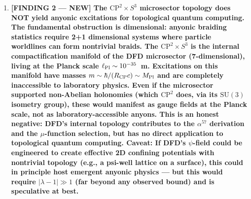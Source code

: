 \documentclass[11pt]{article}
\theoremstyle{definition}
\theoremstyle{remark}
\newcommand{\lamdiff}{|\lambda-1|}
\begin{document}
\begin{tcolorbox}[colback=blue!5!white, colframe=blue!60!black,
  title=\textbf{W4i16 TOP 5 FINDINGS --- READ FIRST}]
\begin{enumerate}[nosep]
\item \textbf{[FINDING 2 --- NEW] The $\mathrm{CP}^2 \times S^3$ microsector
  topology does NOT yield anyonic excitations for topological quantum computing.
  The fundamental obstruction is dimensional: anyonic braiding statistics require
  2+1 dimensional systems where particle worldlines can form nontrivial braids.
  The $\mathrm{CP}^2 \times S^3$ is the internal compactification manifold of
  the DFD microsector (7-dimensional), living at the Planck scale $\ell_{\rm Pl}
  \sim 10^{-35}$~m.  Excitations on this manifold have masses $m \sim
  \hbar/(R_{\rm CP} c) \sim M_{\rm Pl}$ and are completely inaccessible to
  laboratory physics.  Even if the microsector supported non-Abelian holonomies
  (which $\mathrm{CP}^2$ does, via its $\mathrm{SU}(3)$ isometry group), these
  would manifest as gauge fields at the Planck scale, not as laboratory-accessible
  anyons.  This is an honest negative:  DFD's internal topology contributes
  to the $\alpha^{57}$ derivation and the $\mu$-function selection, but has
  no direct application to topological quantum computing.
  \textbf{Caveat}: If DFD's $\psi$-field could be engineered to create effective
  2D confining potentials with nontrivial topology (e.g., a psi-well lattice
  on a surface), this could in principle host emergent anyonic physics --- but
  this would require $\lamdiff \gg 1$ (far beyond any observed bound) and is
  speculative at best.}


\end{enumerate}
\end{tcolorbox}
\end{document}
